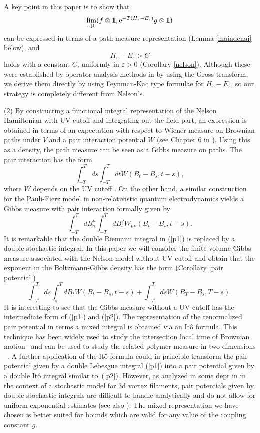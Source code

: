 \documentclass[12pt]{article}
\def\bbbone{{\mathchoice {\rm 1\mskip-4mu l} {\rm 1\mskip-4mu l}
{\rm 1\mskip-4.5mu l} {\rm 1\mskip-5mu l}}}
\def\one{\bbbone}
\providecommand{\eq}[1]{\begin{equation}\label{#1}}
\providecommand{\en}{\end{equation}}
\providecommand{\kak}[1]{(\ref{#1})}
\providecommand{\e}{{\rm e}}
\providecommand{\1}{\mathbb{1}}
\providecommand{\eps}{\varepsilon}
\newcounter {constant}
\begin{document}
A key point in this paper is to show that
\eq{DD}
\lim_{\eps\downarrow0}
(f\otimes\one, \e^{-T(H_\eps-E_\eps)}g\otimes \one)
\en
can be expressed in terms of a path measure representation
(Lemma \ref{maindenai} below), and
\eq{CC}
H_\eps-E_\eps>C
\en
holds with a constant $C$, uniformly in $\eps>0$ (Corollary \ref{nelson}). Although these were established by
operator analysis methods in \cite{nel64} by using the Gross transform, we derive them directly by using
Feynman-Kac type formulae for $H_\eps-E_\eps$, so our strategy is completely different from Nelson's.

\medskip
\noindent
(2)
By constructing a functional integral representation of the Nelson Hamiltonian with UV cutoff and integrating out
the field part, an expression is obtained in terms of an expectation with respect to Wiener measure on Brownian
paths under $V$ and a pair interaction potential $W$ (see Chapter 6 in \cite{lhb11}). Using this as a density,
the path measure can be seen as a Gibbs measure on paths. The pair interaction has the form
\eq{p1}
\int_{-T}^ T ds \int_{-T}^ T dt W(B_t-B_s,t-s),
\en
where $W$ depends on the UV cutoff \cite{bhlms02}. On the other hand, a similar construction for the Pauli-Fierz
model in non-relativistic quantum electrodynamics yields a Gibbs measure with pair interaction formally given by
\cite{spo87,bh09}
\eq{p2}
\int_{-T}^ T dB_s^\mu  \int_{-T}^ T dB_t^\nu  W_{\mu\nu}(B_t-B_s,t-s).
\en
It is remarkable that the double Riemann integral in \kak{p1} is replaced by a double stochastic integral.
In this paper we will consider the finite volume Gibbs measure associated with the Nelson model without UV
cutoff and obtain that the exponent in the Boltzmann-Gibbs density has the form
(Corollary \ref{pair potential})
\eq{p3}
\int_{-T}^ T ds \int_{s}^ T dB_t  W(B_t-B_s,t-s) +\int _{-T}^T ds W(B_T-B_s,T-s).
\en
It is interesting to see that the Gibbs measure without a UV cutoff has the intermediate form of \kak{p1} and
\kak{p2}. The representation of the renormalized pair potential in terms a mixed integral is obtained via an 
It\^o formula. This technique has been widely used to study the intersection local time of Brownian 
motion~\cite{Yo1,Yo2,Yo3} and can be used to study the related polymer measure in two dimensions ~\cite{LeG1,LeG3}. 
A further application of the It\^o formula could in principle transform the pair potential given by a double 
Lebesgue integral \kak{p1} into a pair potential given by a double It\^o integral similar to~\kak{p2}. However, 
as analyzed in some dept in \cite{FG1} in the context of a stochastic model for 3d vortex filaments, pair 
potentials given by double stochastic integrals are difficult to  handle analytically and do not allow for uniform 
exponential estimates (see also \cite{GL}). The mixed representation we have chosen is better suited for bounds 
which are valid for any value of the coupling constant $g$.
\end{document}
